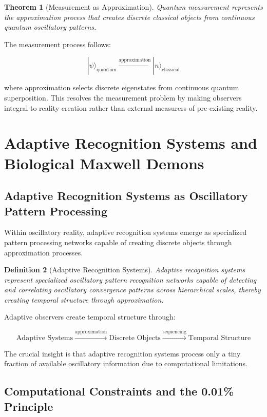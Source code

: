 \documentclass[11pt,a4paper]{article}
\newtheorem{theorem}{Theorem}[section]
\newtheorem{definition}[theorem]{Definition}
\theoremstyle{remark}
\begin{document}
\begin{theorem}[Measurement as Approximation]
Quantum measurement represents the approximation process that creates discrete classical objects from continuous quantum oscillatory patterns.
\end{theorem}

The measurement process follows:

$$|\psi\rangle_{\text{quantum}} \xrightarrow{\text{approximation}} |n\rangle_{\text{classical}}$$

where approximation selects discrete eigenstates from continuous quantum superposition. This resolves the measurement problem by making observers integral to reality creation rather than external measurers of pre-existing reality.

\section{Adaptive Recognition Systems and Biological Maxwell Demons}

\subsection{Adaptive Recognition Systems as Oscillatory Pattern Processing}

Within oscillatory reality, adaptive recognition systems emerge as specialized pattern processing networks capable of creating discrete objects through approximation processes.

\begin{definition}[Adaptive Recognition Systems]
Adaptive recognition systems represent specialized oscillatory pattern recognition networks capable of detecting and correlating oscillatory convergence patterns across hierarchical scales, thereby creating temporal structure through approximation.
\end{definition}

Adaptive observers create temporal structure through:

$$\text{Adaptive Systems} \xrightarrow{\text{approximation}} \text{Discrete Objects} \xrightarrow{\text{sequencing}} \text{Temporal Structure}$$

The crucial insight is that adaptive recognition systems process only a tiny fraction of available oscillatory information due to computational limitations.

\subsection{Computational Constraints and the 0.01\% Principle}
\end{document}
